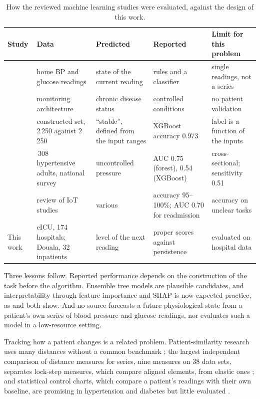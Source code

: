 \documentclass[11pt,a4paper,oneside]{report}
\begin{document}
\begin{table}[htbp]
\centering\footnotesize
\caption{How the reviewed machine learning studies were evaluated, against the design of this work.}\label{tab:ml-studies}
\begin{tabularx}{\textwidth}{@{}>{\raggedright\arraybackslash}p{2.3cm} >{\raggedright\arraybackslash}X >{\raggedright\arraybackslash}X >{\raggedright\arraybackslash}X >{\raggedright\arraybackslash}X@{}}
\toprule
\textbf{Study} & \textbf{Data} & \textbf{Predicted} & \textbf{Reported} & \textbf{Limit for this problem} \\
\midrule
\textcite{chatrati2022} & home BP and glucose readings & state of the current reading & rules and a classifier & single readings, not a series \\
\textcite{tai2024} & monitoring architecture & chronic disease status & controlled conditions & no patient validation \\
\textcite{efendi2025} & constructed set, 2\,250 against 2\,250 & ``stable'', defined from the input ranges & XGBoost accuracy 0.973 & label is a function of the inputs \\
\textcite{mendoza2025} & 1\,308 hypertensive adults, national survey & uncontrolled pressure & AUC 0.75 (forest), 0.54 (XGBoost) & cross-sectional; sensitivity 0.51 \\
\textcite{liu2025review} & review of IoT studies & various & accuracy 95--100\%; AUC 0.70 for readmission & accuracy on unclear tasks \\
\addlinespace
This work & eICU, 174 hospitals; Douala, 32 inpatients & level of the next reading & proper scores against persistence & evaluated on hospital data \\
\bottomrule
\end{tabularx}
\end{table}

Three lessons follow. Reported performance depends on the construction of the task before the algorithm. Ensemble tree models are plausible candidates, and interpretability through feature importance and SHAP is now expected practice, as \textcite{mendoza2025} and \textcite{liu2025ppg} both show. And no source forecasts a future physiological state from a patient's own series of blood pressure and glucose readings, nor evaluates such a model in a low-resource setting.

Tracking how a patient changes is a related problem. Patient-similarity research uses many distances without a common benchmark \parencite{parimbelli2018,sharafoddini2017}; the largest independent comparison of distance measures for series, nine measures on 38 data sets, separates lock-step measures, which compare aligned elements, from elastic ones \parencite{wang2013timeseries}; and statistical control charts, which compare a patient's readings with their own baseline, are promising in hypertension and diabetes but little evaluated \parencite{tennant2007}.
\end{document}
